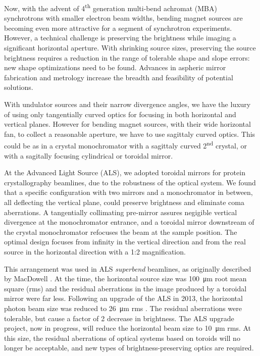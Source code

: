 \documentclass[preprint]{iucr}       %
\newcommand{\inred}[1]{{\color{red}#1}}
\begin{document}
Now, with the advent of 4\textsuperscript{th} generation multi-bend achromat (MBA) synchrotrons with smaller electron beam widths, bending magnet sources are becoming even more attractive for a segment of synchrotron experiments. However, a technical challenge is preserving the brightness while imaging a significant horizontal aperture. With shrinking source sizes, preserving the source brightness requires a reduction in the range of tolerable shape and slope errors: new shape optimizations need to be found. Advances in aspheric mirror fabrication and metrology increase the breadth and feasibility of potential solutions.

With undulator sources and their narrow divergence angles, we have the luxury of using only tangentially curved optics for focusing in both horizontal and vertical planes. However for bending magnet sources, with their wide horizontal fan, to collect a reasonable aperture, we have to use sagittaly curved optics. This could be as in a crystal monochromator with a sagittaly curved 2\textsuperscript{nd} crystal, or with a sagitally focusing cylindrical or toroidal mirror.

At the Advanced Light Source (ALS), we adopted toroidal mirrors for protein crystallography beamlines, due to the robustness of the optical system. We found that a specific configuration \inred{with two mirrors and a monochromator in between, all deflecting  the vertical plane,} could preserve brightness and eliminate coma aberrations. 
A tangentially collimating pre-mirror \inred{assures negigible vertical divergence at the monochromator entrance,} and a toroidal mirror downstream of the crystal monochromator \inred{refocuses the beam at the sample position.} The optimal design focuses from infinity in the vertical direction and from the real source in the horizontal direction with a 1:2 magnification.

This arrangement was used in ALS \emph{superbend} beamlines, as originally described by MacDowell \cite{MacDowell2004}. At the time, the horizontal source size was \SI{100}{\micro\meter} root mean square (rms) and the residual aberrations in the image produced by a toroidal mirror were far less. Following an upgrade of the ALS in 2013, the horizontal photon beam size was reduced \cite{Steier_2014} to
\SI{26}{\micro\meter} rms . The residual aberrations were tolerable, but cause a factor of 2 decrease in brightness. The ALS upgrade project, now in progress, will reduce the horizontal beam size to
\SI{10}{\micro\meter} rms. At this size, the residual aberrations of optical systems based on toroids will no longer be acceptable, and new types of brightness-preserving optics are required.
\end{document}
